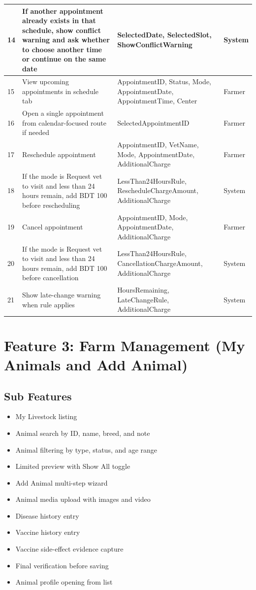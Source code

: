 \documentclass[12pt]{article}
\begin{document}
\begin{longtable}{|p{1.2cm}|p{5.6cm}|p{5.7cm}|p{2cm}|}
\hline
\rowcolor{rowgray}
14 & If another appointment already exists in that schedule, show conflict warning and ask whether to choose another time or continue on the same date & SelectedDate, SelectedSlot, ShowConflictWarning & System \\
\hline
15 & View upcoming appointments in schedule tab & AppointmentID, Status, Mode, AppointmentDate, AppointmentTime, Center & Farmer \\
\hline
\rowcolor{rowgray}
16 & Open a single appointment from calendar-focused route if needed & SelectedAppointmentID & Farmer \\
\hline
17 & Reschedule appointment & AppointmentID, VetName, Mode, AppointmentDate, AdditionalCharge & Farmer \\
\hline
\rowcolor{rowgray}
18 & If the mode is Request vet to visit and less than 24 hours remain, add BDT 100 before rescheduling & LessThan24HoursRule, RescheduleChargeAmount, AdditionalCharge & System \\
\hline
19 & Cancel appointment & AppointmentID, Mode, AppointmentDate, AdditionalCharge & Farmer \\
\hline
\rowcolor{rowgray}
20 & If the mode is Request vet to visit and less than 24 hours remain, add BDT 100 before cancellation & LessThan24HoursRule, CancellationChargeAmount, AdditionalCharge & System \\
\hline
21 & Show late-change warning when rule applies & HoursRemaining, LateChangeRule, AdditionalCharge & System \\
\hline
\end{longtable}

\newpage
\section{Feature 3: Farm Management (My Animals and Add Animal)}

\subsection{Sub Features}
\begin{itemize}
    \item My Livestock listing
    \item Animal search by ID, name, breed, and note
    \item Animal filtering by type, status, and age range
    \item Limited preview with Show All toggle
    \item Add Animal multi-step wizard
    \item Animal media upload with images and video
    \item Disease history entry
    \item Vaccine history entry
    \item Vaccine side-effect evidence capture
    \item Final verification before saving
    \item Animal profile opening from list
\end{itemize}
\end{document}

